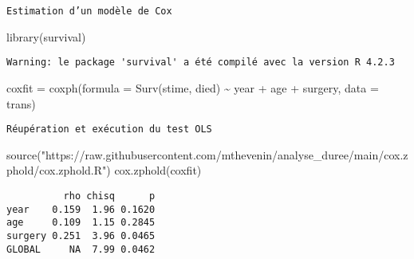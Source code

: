 \documentclass[
  letterpaper,
  DIV=11,
  numbers=noendperiod]{scrartcl}
\newenvironment{Shaded}{\begin{snugshade}}{\end{snugshade}}
\newcommand{\AttributeTok}[1]{\textcolor[rgb]{1.00,0.47,0.78}{#1}}
\newcommand{\FunctionTok}[1]{\textcolor[rgb]{0.31,0.98,0.48}{#1}}
\newcommand{\NormalTok}[1]{\textcolor[rgb]{0.97,0.97,0.95}{#1}}
\newcommand{\OtherTok}[1]{\textcolor[rgb]{0.31,0.98,0.48}{#1}}
\newcommand{\SpecialCharTok}[1]{\textcolor[rgb]{1.00,0.47,0.78}{#1}}
\newcommand{\StringTok}[1]{\textcolor[rgb]{0.95,0.98,0.55}{#1}}
\begin{document}
\begin{codelisting}

\caption{\texttt{Estimation d'un modèle de Cox}}

\begin{Shaded}
\begin{Highlighting}[]
\FunctionTok{library}\NormalTok{(survival)}
\end{Highlighting}
\end{Shaded}

\end{codelisting}

\begin{verbatim}
Warning: le package 'survival' a été compilé avec la version R 4.2.3
\end{verbatim}

\begin{Shaded}
\begin{Highlighting}[]
\NormalTok{coxfit }\OtherTok{=} \FunctionTok{coxph}\NormalTok{(}\AttributeTok{formula =} \FunctionTok{Surv}\NormalTok{(stime, died) }\SpecialCharTok{\textasciitilde{}}\NormalTok{ year }\SpecialCharTok{+}\NormalTok{ age }\SpecialCharTok{+}\NormalTok{ surgery, }\AttributeTok{data =}\NormalTok{ trans)}
\end{Highlighting}
\end{Shaded}

\begin{codelisting}

\caption{\texttt{Réupération et exécution du test OLS}}

\begin{Shaded}
\begin{Highlighting}[]
\FunctionTok{source}\NormalTok{(}\StringTok{"https://raw.githubusercontent.com/mthevenin/analyse\_duree/main/cox.zphold/cox.zphold.R"}\NormalTok{)}
\FunctionTok{cox.zphold}\NormalTok{(coxfit)}
\end{Highlighting}
\end{Shaded}

\end{codelisting}

\begin{verbatim}
          rho chisq      p
year    0.159  1.96 0.1620
age     0.109  1.15 0.2845
surgery 0.251  3.96 0.0465
GLOBAL     NA  7.99 0.0462
\end{verbatim}
\end{document}
